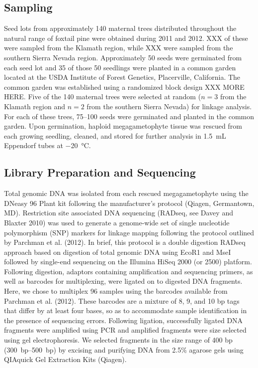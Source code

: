 \documentclass[11pt]{article}
\begin{document}
\subsection{Sampling}
Seed lots from approximately 140 maternal trees distributed throughout the natural range 
of foxtail pine were obtained during 2011 and 2012. XXX of these were sampled from the 
Klamath region, while XXX were sampled from the southern Sierra Nevada region. Approximately 
50 seeds were germinated from each seed lot and 35 of those 50 seedlings were planted in a 
common garden located at the USDA Institute of Forest Genetics, Placerville, California. The 
common garden was established using a randomized block design XXX MORE HERE. Five of the 
140 maternal trees were selected at random ($n = 3$ from the Klamath region and $n = 2$ from 
the southern Sierra Nevada) for linkage analysis. For each of these trees, \SIrange{75}{100}{} 
seeds were germinated and planted in the common garden. Upon germination, haploid 
megagametophyte tissue was rescued from each growing seedling, cleaned, and stored for further 
analysis in \SI{1.5}{\mL} Eppendorf tubes at \SI{-20}{\celsius}.


\subsection{Library Preparation and Sequencing}

Total genomic DNA was isolated from each rescued megagametophyte using the DNeasy 96 Plant 
kit following the manufacturer’s protocol (Qiagen, Germantown, MD). Restriction site associated DNA 
sequencing (RADseq, see Davey and Blaxter 2010) was used to generate a genome-wide set of 
single nucleotide polymorphism (SNP) markers for linkage mapping following the protocol 
outlined by Parchman et al. (2012). In brief, this protocol is a double digestion RADseq 
approach based on digestion of total genomic DNA using EcoR1 and MseI followed by single-end 
sequencing on the Illumina HiSeq 2000 (or 2500) platform. Following digestion, adaptors 
containing amplification and sequencing primers, as well as barcodes for multiplexing, 
were ligated on to digested DNA fragments. Here, we chose to multiplex 96 samples using the 
barcodes available from Parchman et al. (2012). These barcodes are a mixture of 8, 9, and 
10 bp tags that differ by at least four bases, so as to accommodate sample identification in the 
presence of sequencing errors. Following ligation, successfully ligated DNA fragments were 
amplified using PCR and amplified fragments were size selected using gel electrophoresis. We selected 
fragments in the size range of 400 bp (\SIrange{300}{500}{bp}) by excising and purifying DNA from 2.5\% 
agarose gels using QIAquick Gel Extraction Kits (Qiagen).
\end{document}
